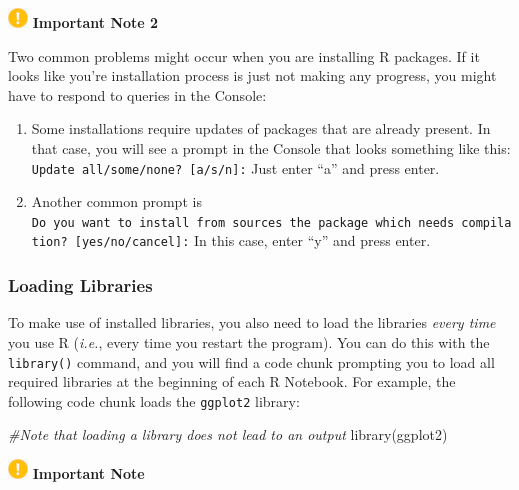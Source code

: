 \documentclass[
]{book}
\newenvironment{Shaded}{\begin{snugshade}}{\end{snugshade}}
\newcommand{\CommentTok}[1]{\textcolor[rgb]{0.56,0.35,0.01}{\textit{#1}}}
\newcommand{\FunctionTok}[1]{\textcolor[rgb]{0.00,0.00,0.00}{#1}}
\newcommand{\NormalTok}[1]{#1}
\begin{document}
\includegraphics[width=0.20833in,height=\textheight]{images/important.png} \textbf{Important Note 2}

Two common problems might occur when you are installing R packages. If it looks like you're installation process is just not making any progress, you might have to respond to queries in the Console:

\begin{enumerate}
\def\labelenumi{\arabic{enumi}.}
\item
  Some installations require updates of packages that are already present. In that case, you will see a prompt in the Console that looks something like this: \texttt{Update\ all/some/none?\ {[}a/s/n{]}:} Just enter ``a'' and press enter.
\item
  Another common prompt is \texttt{Do\ you\ want\ to\ install\ from\ sources\ the\ package\ which\ needs\ compilation?\ {[}yes/no/cancel{]}:} In this case, enter ``y'' and press enter.
\end{enumerate}

\hypertarget{loading-libraries}{%
\subsubsection*{Loading Libraries}\label{loading-libraries}}

To make use of installed libraries, you also need to load the libraries \emph{every time} you use R (\emph{i.e.}, every time you restart the program). You can do this with the \texttt{library()} command, and you will find a code chunk prompting you to load all required libraries at the beginning of each R Notebook. For example, the following code chunk loads the \texttt{ggplot2} library:

\begin{Shaded}
\begin{Highlighting}[]
\CommentTok{\#Note that loading a library does not lead to an output}
\FunctionTok{library}\NormalTok{(ggplot2)}
\end{Highlighting}
\end{Shaded}

\includegraphics[width=0.20833in,height=\textheight]{images/important.png} \textbf{Important Note}
\end{document}
